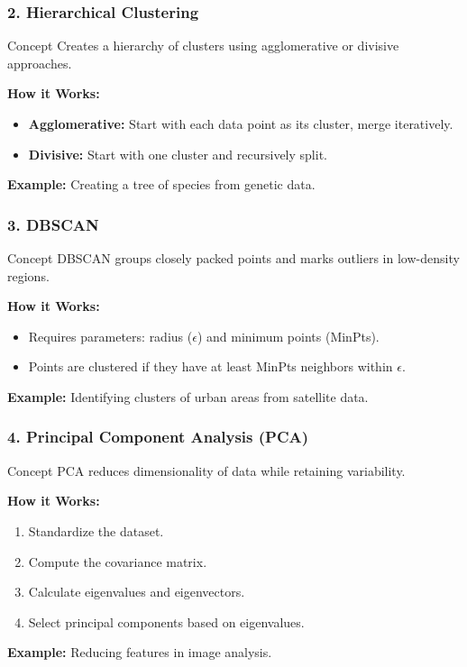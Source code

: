 \documentclass[aspectratio=169]{beamer}
\begin{document}
\begin{frame}[fragile]
    \frametitle{2. Hierarchical Clustering}
    \begin{block}{Concept}
        Creates a hierarchy of clusters using agglomerative or divisive approaches.
    \end{block}
    \textbf{How it Works:}
    \begin{itemize}
        \item \textbf{Agglomerative:} Start with each data point as its cluster, merge iteratively.
        \item \textbf{Divisive:} Start with one cluster and recursively split.
    \end{itemize}
    \textbf{Example:} Creating a tree of species from genetic data.
\end{frame}

\begin{frame}[fragile]
    \frametitle{3. DBSCAN}
    \begin{block}{Concept}
        DBSCAN groups closely packed points and marks outliers in low-density regions.
    \end{block}
    \textbf{How it Works:}
    \begin{itemize}
        \item Requires parameters: radius (\(\epsilon\)) and minimum points (MinPts).
        \item Points are clustered if they have at least MinPts neighbors within \(\epsilon\).
    \end{itemize}
    \textbf{Example:} Identifying clusters of urban areas from satellite data.
\end{frame}

\begin{frame}[fragile]
    \frametitle{4. Principal Component Analysis (PCA)}
    \begin{block}{Concept}
        PCA reduces dimensionality of data while retaining variability.
    \end{block}
    \textbf{How it Works:}
    \begin{enumerate}
        \item Standardize the dataset.
        \item Compute the covariance matrix.
        \item Calculate eigenvalues and eigenvectors.
        \item Select principal components based on eigenvalues.
    \end{enumerate}
    \textbf{Example:} Reducing features in image analysis.
\end{frame}
\end{document}
